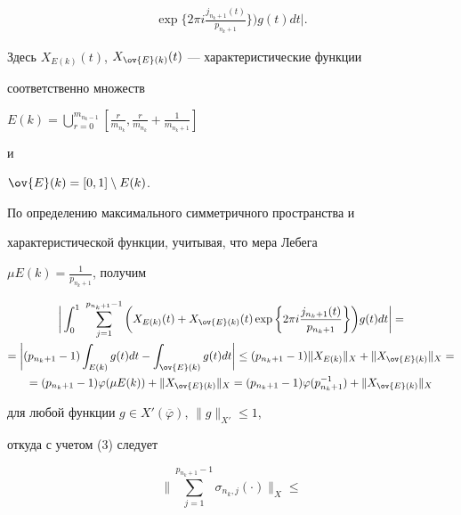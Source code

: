 \begin{pf}
\begin{multline}
\exp\bigg\{2\pi i\frac{j_{n_{k}+1}(t)}{p_{n_{k}+1}}\bigg\}


\bigg)g(t)dt\bigg|.


\end{multline}


Здесь $X_{E(k)}(t)$, $X_{\ov{E}(k)}(t)$ --- характеристические функции 


соответственно множеств


$E(k)=\bigcup\limits_{r=0}^{m_{n_{k}-1}}


[\frac{r}{m_{n_{k}}},\frac{r}{m_{n_{k}}}+\frac{1}{m_{n_{k}+1}}]$


и


$\ov{E}(k)=[0,1]\setminus E(k)$.





По определению максимального симметричного пространства и 


характеристической функции, учитывая, что мера Лебега


$\mu E(k)=\frac{1}{p_{n_{k}+1}}$, получим


\begin{multline*}


\bigg|\int_{0}^{1}\ \sum_{j=1}^{p_{n_{k}+1}-1}\bigg(X_{E(k)}(t)+


X_{\ov{E}(k)}(t) \exp\bigg\{2\pi i\frac{j_{n_{k}+1}(t)}


{p_{n_{k}+1}}\bigg\}\bigg)g(t)dt\bigg|= \\


%


=\bigg|(p_{n_{k}+1}-1)


\int_{E(k)}g(t)dt-\int_{\ov{E}(k)}g(t)dt\bigg|\leq


(p_{n_{k}+1}-1)\|X_{E(k)}\|_{X}+\|X_{\ov{E}(k)}\|_{X}= \\


%


=(p_{n_{k}+1}-1)\varphi(\mu E(k))+


\|X_{\ov{E}(k)}\|_{X}=(p_{n_{k}+1}-1)\varphi(p_{n_{k}+1}^{-1})+


\|X_{\ov{E}(k)}\|_{X} 


\end{multline*}


для любой функции $g\in X'(\overline{\varphi})$, $\|g\|_{X'}\leq 1$,


откуда с учетом (3) следует


\begin{equation}


\bigg\| \sum_{j=1}^{p_{n_{k}+1}-1}\sigma_{n_{k},j}(\cdot) \bigg\|_{X}\leq



\end{equation}
\end{pf}
